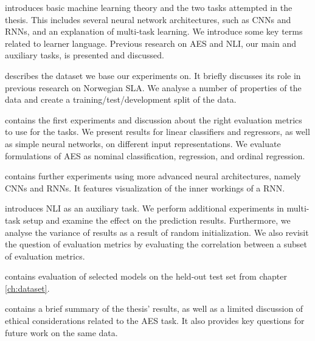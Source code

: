 \begin{description}[style=unboxed,leftmargin=0cm]
\item [Chapter \ref{ch:background}]
  introduces basic machine learning theory and the two tasks attempted in the
  thesis. This includes several neural network architectures, such as
  \acp{CNN} and \acp{RNN}, and an explanation of multi-task learning. We
  introduce some key terms related to learner language. Previous research on
  \ac{AES} and \ac{NLI}, our main and auxiliary tasks, is presented and
  discussed.

\item [Chapter \ref{ch:dataset}]
  describes the dataset we base our experiments on. It briefly discusses its
  role in previous research on Norwegian \ac{SLA}. We analyse a number of
  properties of the data and create a training/test/development split of the
  data.

\item [Chapter \ref{ch:experiments}]
  contains the first experiments and discussion about the right evaluation
  metrics to use for the tasks. We present results for linear classifiers and
  regressors, as well as simple neural networks, on different input
  representations. We evaluate formulations of \ac{AES} as nominal
  classification, regression, and ordinal regression.

\item [Chapter \ref{ch:sequencemodels}]
  contains further experiments using more advanced neural architectures,
  namely \acp{CNN} and \acp{RNN}. It features visualization of the inner
  workings of a RNN.

\item [Chapter \ref{ch:multitask}]
  introduces \ac{NLI} as an auxiliary task. We perform additional experiments
  in multi-task setup and examine the effect on the prediction results.
  Furthermore, we analyse the variance of results as a result of random
  initialization. We also revisit the question of evaluation metrics by
  evaluating the correlation between a subset of evaluation metrics.

\item [Chapter \ref{ch:heldout}]
  contains evaluation of selected models on the held-out test set from
  chapter \ref{ch:dataset}.

\item [Chapter \ref{ch:conclusion}]
  contains a brief summary of the thesis' results, as well as a limited
  discussion of ethical considerations related to the \ac{AES} task. It
  also provides key questions for future work on the same data.
\end{description}

\acresetall
